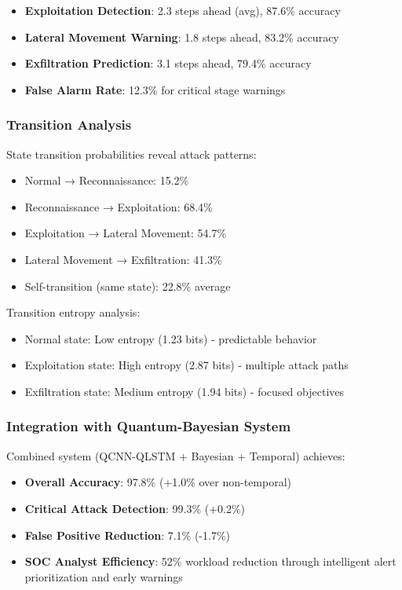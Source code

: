 \documentclass[conference]{IEEEtran}
\begin{document}
\begin{itemize}
    \item \textbf{Exploitation Detection}: 2.3 steps ahead (avg), 87.6\% accuracy
    \item \textbf{Lateral Movement Warning}: 1.8 steps ahead, 83.2\% accuracy
    \item \textbf{Exfiltration Prediction}: 3.1 steps ahead, 79.4\% accuracy
    \item \textbf{False Alarm Rate}: 12.3\% for critical stage warnings
\end{itemize}

\subsubsection{Transition Analysis}
State transition probabilities reveal attack patterns:

\begin{itemize}
    \item Normal → Reconnaissance: 15.2\%
    \item Reconnaissance → Exploitation: 68.4\%
    \item Exploitation → Lateral Movement: 54.7\%
    \item Lateral Movement → Exfiltration: 41.3\%
    \item Self-transition (same state): 22.8\% average
\end{itemize}

Transition entropy analysis:
\begin{itemize}
    \item Normal state: Low entropy (1.23 bits) - predictable behavior
    \item Exploitation state: High entropy (2.87 bits) - multiple attack paths
    \item Exfiltration state: Medium entropy (1.94 bits) - focused objectives
\end{itemize}

\subsubsection{Integration with Quantum-Bayesian System}
Combined system (QCNN-QLSTM + Bayesian + Temporal) achieves:

\begin{itemize}
    \item \textbf{Overall Accuracy}: 97.8\% (+1.0\% over non-temporal)
    \item \textbf{Critical Attack Detection}: 99.3\% (+0.2\%)
    \item \textbf{False Positive Reduction}: 7.1\% (-1.7\%)
    \item \textbf{SOC Analyst Efficiency}: 52\% workload reduction through intelligent alert prioritization and early warnings
\end{itemize}
\end{document}

